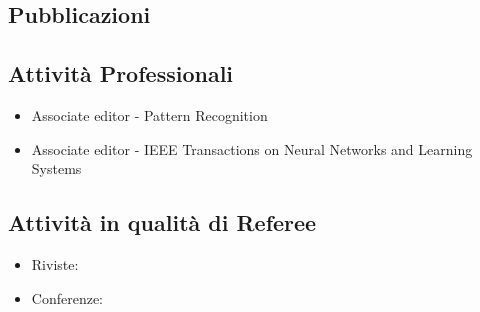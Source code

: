 \documentclass[a4paper,10pt]{article}
\begin{document}
\subsection*{Pubblicazioni}



\subsection*{Attivit\`a Professionali}
\begin{itemize}
\item Associate editor - Pattern Recognition
\item Associate editor - IEEE Transactions on Neural Networks and Learning Systems
\end{itemize}


\subsection*{Attivit\`a in qualit\`a di Referee}
\begin{itemize}
\item Riviste:


\item Conferenze:

\end{itemize}
\end{document}

